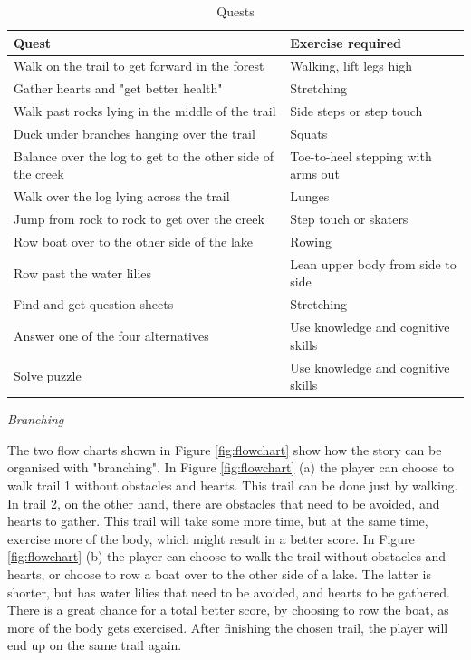 \begin{table}
\begin{tabular}{|>{\raggedright}p{}|p{}|}
\hline
\textbf{Quest} & \textbf{Exercise required}  \\ \hline
Walk on the trail to get forward in the forest & Walking, lift legs high \\ \hline
Gather hearts and "get better health" &  Stretching \\ \hline
Walk past rocks lying in the middle of the trail & Side steps or step touch  \\ \hline
Duck under branches hanging over the trail & Squats
\\ \hline
Balance over the log to get to the other side of the creek & Toe-to-heel stepping with arms out \\ \hline
Walk over the log lying across the trail & Lunges \\ \hline
Jump from rock to rock to get over the creek & Step touch or skaters \\ \hline
Row boat over to the other side of the lake & Rowing \\ \hline
Row past the water lilies & Lean upper body from side to side \\ \hline
Find and get question sheets  & Stretching \\ \hline
Answer one of the four alternatives & Use knowledge and cognitive skills \\ \hline
Solve puzzle & Use knowledge and cognitive skills \\ \hline
\end{tabular}
\caption[Quests in the "Nature trail" game]{Quests}
\label{tab:quests1}
\end{table}
 \newpage
 
\emph{Branching}

The two flow charts shown in Figure \ref{fig:flowchart} show how the story can be organised with "branching". In Figure \ref{fig:flowchart} (a) the player can choose to walk trail 1 without obstacles and hearts. This trail can be done just by walking. In trail 2, on the other hand, there are obstacles that need to be avoided, and hearts to gather. This trail will take some more time, but at the same time, exercise more of the body, which might result in a better score. In Figure \ref{fig:flowchart} (b) the player can choose to walk the trail without obstacles and hearts, or choose to row a boat over to the other side of a lake. The latter is shorter, but has water lilies that need to be avoided, and hearts to be gathered. There is a great chance for a total better score, by choosing to row the boat, as more of the body gets exercised. After finishing the chosen trail, the player will end up on the same trail again.

